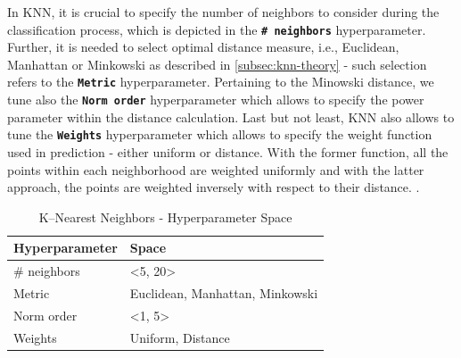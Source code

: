 In KNN, it is crucial to specify the number of neighbors to consider during the classification process, which is depicted in the \textbf{\texttt{\# neighbors}} hyperparameter.
Further, it is needed to select optimal distance measure, i.e., Euclidean, Manhattan or Minkowski as described in \autoref{subsec:knn-theory} - such selection refers to the \textbf{\texttt{Metric}} hyperparameter.
Pertaining to the Minowski distance, we tune also the \textbf{\texttt{Norm order}} hyperparameter which allows to specify the power parameter within the distance calculation.
Last but not least, KNN also allows to tune the \textbf{\texttt{Weights}} hyperparameter which allows to specify the weight function used in prediction - either uniform or distance. With the former function, all the points within each neighborhood are weighted uniformly and with the latter approach, the points are weighted inversely with respect to their distance. \citep{scikit-knn}.
\begin{table}[H]
\small
\setlength{\tabcolsep}{8pt}
\renewcommand{\arraystretch}{1.3}
\centering
    \caption[K--Nearest Neighbors - Hyperparameter Space]{K--Nearest Neighbors - Hyperparameter Space}\label{tab:knnspace}
    \begin{tabular}{ll}
\toprule
\textbf{Hyperparameter} & \textbf{Space}\\
\midrule
\hline
\# neighbors & <5, 20> \\
Metric & Euclidean, Manhattan, Minkowski \\
Norm order & <1, 5> \\
Weights & Uniform, Distance \\
\hline
\bottomrule
\end{tabular}
\vspace{0.7em}

\vspace{-1em}
\end{table}

